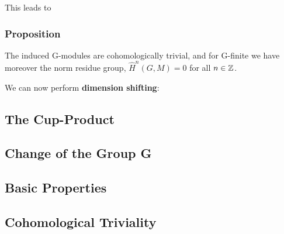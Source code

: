 This leads to
\subsubsection{Proposition}
The induced G-modules are cohomologically trivial, and for G-finite we have moreover the norm residue group, $\hat H^n (G,M) = 0$ for all $n\in \mathbb Z$.

We can now perform \textbf{dimension shifting}:












\subsection{The Cup-Product}
\subsection{Change of the Group G}
\subsection{Basic Properties}
\subsection{Cohomological Triviality}




